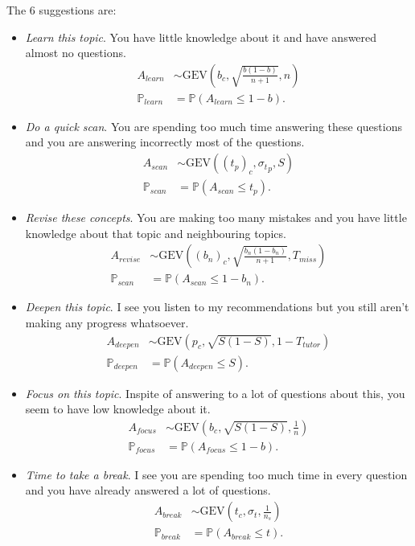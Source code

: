 \documentclass{article}
\newcommand{\0}{\mathbbold{0}}
\newcommand{\1}{\mathds{1}}
\newcommand{\GEV}[3]{\text{GEV}\!\left(#1,#2,#3\right)}
\begin{document}
The $6$ suggestions are:
\begin{itemize}
    \item \textsl{Learn this topic}. You have little knowledge about it and have answered almost no questions.
    \begin{align*}
        A_{learn} &\sim \GEV{b_c}{\sqrt{\frac{b(1-b)}{n+1}}}{n} \\
        \mathbb{P}_{learn} &= \mathbb{P}\left(A_{learn} \le 1 - b\right).
    \end{align*}
    \item \textsl{Do a quick scan}. You are spending too much time answering these questions and you are answering incorrectly most of the questions.
    \begin{align*}
        A_{scan} &\sim \GEV{(t_p)_c}{{\sigma_t}_p}{S} \\
        \mathbb{P}_{scan} &= \mathbb{P}\left(A_{scan} \le t_p\right).
    \end{align*}
    \item \textsl{Revise these concepts}. You are making too many mistakes and you have little knowledge about that topic and neighbouring topics.
    \begin{align*}
        A_{revise} &\sim \GEV{(b_n)_c}{\sqrt{\frac{b_n(1-b_n)}{n+1}}}{T_{miss}} \\
        \mathbb{P}_{scan} &= \mathbb{P}\left(A_{scan} \le 1 - b_n\right).
    \end{align*}
    \item \textsl{Deepen this topic}. I see you listen to my recommendations but you still aren't making any progress whatsoever.
    \begin{align*}
        A_{deepen} &\sim \GEV{p_c}{\sqrt{S(1-S)}}{1-T_{tutor}} \\
        \mathbb{P}_{deepen} &= \mathbb{P}\left(A_{deepen} \le S\right).
    \end{align*}
    \item \textsl{Focus on this topic}. Inspite of answering to a lot of questions about this, you seem to have low knowledge about it.
    \begin{align*}
        A_{focus} &\sim \GEV{b_c}{\sqrt{S(1-S)}}{\frac{1}{n}} \\
        \mathbb{P}_{focus} &= \mathbb{P}\left(A_{focus} \le 1 - b\right).
    \end{align*}
    \item \textsl{Time to take a break}. I see you are spending too much time in every question and you have already answered a lot of questions.
    \begin{align*}
        A_{break} &\sim \GEV{t_c}{\sigma_t}{\frac{1}{n_s}} \\
        \mathbb{P}_{break} &= \mathbb{P}\left(A_{break} \le t\right).
    \end{align*}
\end{itemize}
\end{document}
